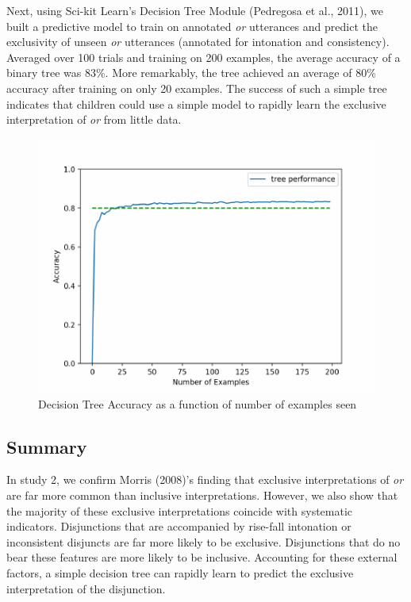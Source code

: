 \documentclass[10pt, letterpaper]{article}
\newenvironment{CodeChunk}{}{}
\begin{document}
Next, using Sci-kit Learn's Decision Tree Module (Pedregosa et al.,
2011), we built a predictive model to train on annotated \emph{or}
utterances and predict the exclusivity of unseen \emph{or} utterances
(annotated for intonation and consistency). Averaged over 100 trials and
training on 200 examples, the average accuracy of a binary tree was
83\%. More remarkably, the tree achieved an average of 80\% accuracy
after training on only 20 examples. The success of such a simple tree
indicates that children could use a simple model to rapidly learn the
exclusive interpretation of \emph{or} from little data.

\begin{CodeChunk}
\begin{figure}[H]

{\centering \includegraphics{figs/learningCurve-1} 

}

\caption[Decision Tree Accuracy as a function of number of examples seen]{Decision Tree Accuracy as a function of number of examples seen}\label{fig:learningCurve}
\end{figure}
\end{CodeChunk}

\subsection{Summary}\label{summary-1}

In study 2, we confirm Morris (2008)'s finding that exclusive
interpretations of \emph{or} are far more common than inclusive
interpretations. However, we also show that the majority of these
exclusive interpretations coincide with systematic indicators.
Disjunctions that are accompanied by rise-fall intonation or
inconsistent disjuncts are far more likely to be exclusive. Disjunctions
that do no bear these features are more likely to be inclusive.
Accounting for these external factors, a simple decision tree can
rapidly learn to predict the exclusive interpretation of the
disjunction.
\end{document}
